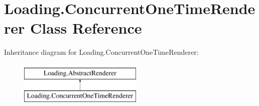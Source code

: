 \hypertarget{class_loading_1_1_concurrent_one_time_renderer}{}\section{Loading.\+Concurrent\+One\+Time\+Renderer Class Reference}
\label{class_loading_1_1_concurrent_one_time_renderer}
Inheritance diagram for Loading.\+Concurrent\+One\+Time\+Renderer\+:\begin{figure}[H]
\begin{center}
\leavevmode
\includegraphics[height=2.000000cm]{class_loading_1_1_concurrent_one_time_renderer}
\end{center}
\end{figure}
